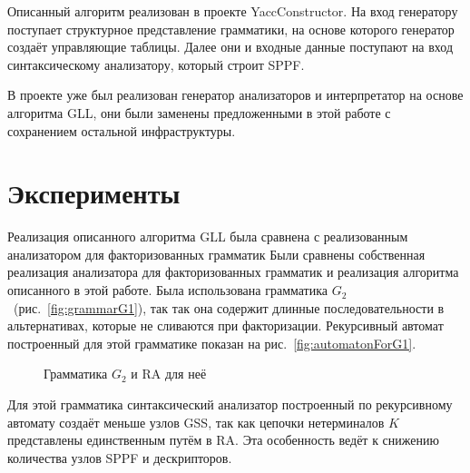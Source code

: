 \documentclass[14pt]{matmex-diploma-custom}
\begin{document}
    Описанный алгоритм реализован в проекте YaccConstructor. 
    На вход генератору поступает структурное представление грамматики, на основе которого 
    генератор создаёт управляющие таблицы. Далее они и входные данные поступают на вход
    синтаксическому анализатору, который строит SPPF. 
    
    В проекте уже был реализован генератор анализаторов и интерпретатор
    на основе алгоритма GLL, они были заменены предложенными в этой работе с сохранением остальной инфраструктуры.

	\section{Эксперименты}
    Реализация описанного алгоритма GLL была сравнена с реализованным анализатором для факторизованных грамматик 
    Были сравнены собственная реализация анализатора для факторизованных грамматик и реализация алгоритма описанного в этой работе.
    Была использована грамматика $G_2$~(рис.~\ref{fig:grammarG1}), так так она содержит длинные последовательности 
    в альтернативах, которые не сливаются при факторизации. Рекурсивный автомат построенный для этой грамматике 
    показан на рис.~\ref{fig:automatonForG1}.
    
    \begin{figure}[ht]   
        \centering
        
        \caption{Грамматика $G_2$ и RA для неё}
    \end{figure}
    
    Для этой грамматика синтаксический анализатор построенный по рекурсивному автомату создаёт меньше узлов GSS, так как 
    цепочки нетерминалов $K$ представлены единственным путём в RA. Эта особенность ведёт к снижению количества 
    узлов SPPF и дескрипторов.
    
\end{document}
